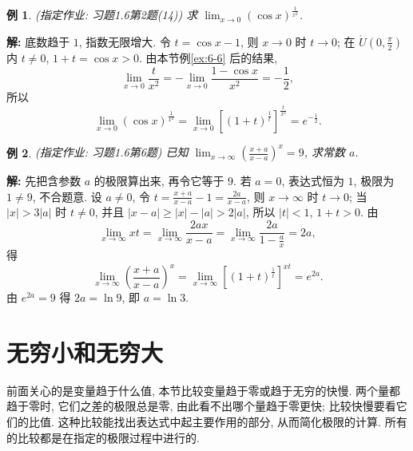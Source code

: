 \documentclass[UTF8,openany]{ctexbook}
\theoremstyle{chinesetextbook}
\newtheorem{example}{例}[section]
\newenvironment{cnsolution}{\par\indent\textbf{解:} \ignorespaces}{\par}
\begin{document}
\begin{example}
\textnormal{(指定作业: 习题1.6第2题(14))} 求 $\displaystyle\lim_{x\to0}(\cos x)^{\frac1{x^2}}$.
\end{example}
\begin{cnsolution}
底数趋于 $1$, 指数无限增大. 令 $t=\cos x-1$, 则 $x\to0$ 时 $t\to0$; 在 $\displaystyle\mathring U\left(0,\frac\pi2\right)$ 内 $t\ne0$, $1+t=\cos x>0$. 由本节例\ref{ex:6-6} 后的结果,
\[
\lim_{x\to0}\frac t{x^2}=-\lim_{x\to0}\frac{1-\cos x}{x^2}=-\frac12,
\]
所以
\[
\lim_{x\to0}(\cos x)^{\frac1{x^2}}=\lim_{x\to0}\left[(1+t)^{\frac1t}\right]^{\frac t{x^2}}=e^{-\frac12}.
\]
\end{cnsolution}
\begin{example}
\textnormal{(指定作业: 习题1.6第6题)} 已知 $\displaystyle\lim_{x\to\infty}\left(\frac{x+a}{x-a}\right)^x=9$, 求常数 $a$.
\end{example}
\begin{cnsolution}
先把含参数 $a$ 的极限算出来, 再令它等于 $9$. 若 $a=0$, 表达式恒为 $1$, 极限为 $1\ne9$, 不合题意. 设 $a\ne0$, 令 $\displaystyle t=\frac{x+a}{x-a}-1=\frac{2a}{x-a}$, 则 $x\to\infty$ 时 $t\to0$; 当 $|x|>3|a|$ 时 $t\ne0$, 并且 $|x-a|\ge|x|-|a|>2|a|$, 所以 $|t|<1$, $1+t>0$. 由
\[
\lim_{x\to\infty}xt=\lim_{x\to\infty}\frac{2ax}{x-a}=\lim_{x\to\infty}\frac{2a}{1-\frac ax}=2a,
\]
得
\[
\lim_{x\to\infty}\left(\frac{x+a}{x-a}\right)^x=\lim_{x\to\infty}\left[(1+t)^{\frac1t}\right]^{xt}=e^{2a}.
\]
由 $e^{2a}=9$ 得 $2a=\ln9$, 即 $a=\ln3$.
\end{cnsolution}
\section{无穷小和无穷大}
前面关心的是变量趋于什么值, 本节比较变量趋于零或趋于无穷的快慢. 两个量都趋于零时, 它们之差的极限总是零, 由此看不出哪个量趋于零更快; 比较快慢要看它们的比值. 这种比较能找出表达式中起主要作用的部分, 从而简化极限的计算. 所有的比较都是在指定的极限过程中进行的.
\end{document}
